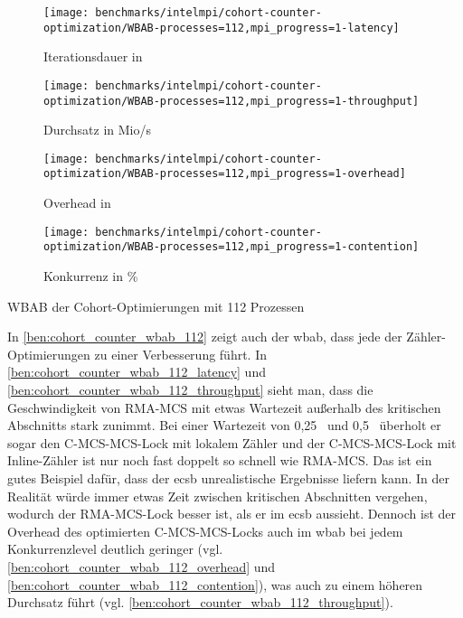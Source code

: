 \begin{benchmark}[h]
    \begin{subfigure}{.5\textwidth}
        \texttt{[image: benchmarks/intelmpi/cohort-counter-optimization/WBAB-processes=112,mpi\_progress=1-latency]}
        \caption{Iterationsdauer in }
        \label{ben:cohort_counter_wbab_112_latency}
    \end{subfigure}
    \begin{subfigure}{.5\textwidth}
        \texttt{[image: benchmarks/intelmpi/cohort-counter-optimization/WBAB-processes=112,mpi\_progress=1-throughput]}
        \caption{Durchsatz in Mio/s}
        \label{ben:cohort_counter_wbab_112_throughput}
    \end{subfigure}
    \begin{subfigure}{.5\textwidth}
        \texttt{[image: benchmarks/intelmpi/cohort-counter-optimization/WBAB-processes=112,mpi\_progress=1-overhead]}
        \caption{Overhead in }
        \label{ben:cohort_counter_wbab_112_overhead}
    \end{subfigure}
    \begin{subfigure}{.5\textwidth}
        \texttt{[image: benchmarks/intelmpi/cohort-counter-optimization/WBAB-processes=112,mpi\_progress=1-contention]}
        \caption{Konkurrenz in \%}
        \label{ben:cohort_counter_wbab_112_contention}
    \end{subfigure}
    \caption{WBAB der Cohort-Optimierungen mit 112 Prozessen}
    \label{ben:cohort_counter_wbab_112}
\end{benchmark}

In \autoref{ben:cohort_counter_wbab_112} zeigt auch der \gls{wbab},
dass jede der Zähler-Optimierungen zu einer Verbesserung führt.
In \autoref{ben:cohort_counter_wbab_112_latency} und \autoref{ben:cohort_counter_wbab_112_throughput} sieht man,
dass die Geschwindigkeit von RMA-MCS mit etwas Wartezeit außerhalb des kritischen Abschnitts stark zunimmt.
Bei einer Wartezeit von 0,25~ und 0,5~ überholt er sogar den C-MCS-MCS-Lock mit lokalem Zähler
und der C-MCS-MCS-Lock mit Inline-Zähler ist nur noch fast doppelt so schnell wie RMA-MCS.
Das ist ein gutes Beispiel dafür,
dass der \gls{ecsb} unrealistische Ergebnisse liefern kann.
In der Realität würde immer etwas Zeit zwischen kritischen Abschnitten vergehen,
wodurch der RMA-MCS-Lock besser ist,
als er im \gls{ecsb} aussieht.
Dennoch ist der Overhead des optimierten C-MCS-MCS-Locks auch im \gls{wbab} bei jedem Konkurrenzlevel deutlich geringer (vgl. \autoref{ben:cohort_counter_wbab_112_overhead} und \autoref{ben:cohort_counter_wbab_112_contention}),
was auch zu einem höheren Durchsatz führt
(vgl. \autoref{ben:cohort_counter_wbab_112_throughput}).

